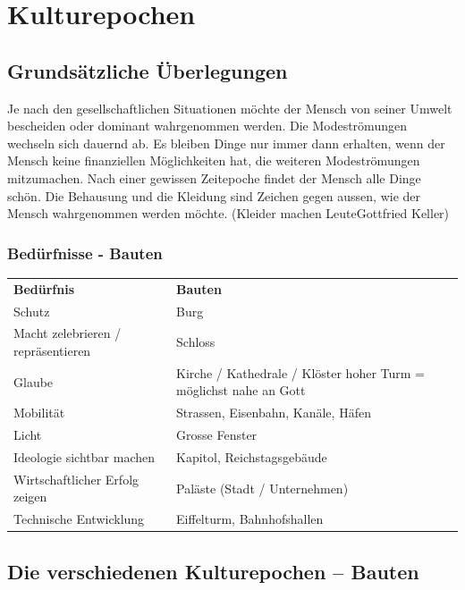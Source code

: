\documentclass[10pt, openright=true]{scrartcl}
\begin{document}
\section{Kulturepochen}
\subsection{Grundsätzliche Überlegungen}
Je nach den gesellschaftlichen Situationen möchte der Mensch von seiner Umwelt bescheiden oder dominant wahrgenommen werden. Die Modeströmungen wechseln sich dauernd ab. Es bleiben Dinge nur immer dann erhalten, wenn der Mensch keine finanziellen Möglichkeiten hat, die weiteren Modeströmungen mitzumachen. Nach einer gewissen Zeitepoche findet der Mensch alle Dinge schön. Die Behausung und die Kleidung sind Zeichen gegen aussen, wie der Mensch wahrgenommen werden möchte. (\glqq Kleider machen Leute\grqq Gottfried Keller)
\subsubsection{Bedürfnisse - Bauten}
\begin{tabularx}{1\textwidth}{L{6cm}   X}
 \textbf{Bedürfnis} & \textbf{Bauten} \\ 
Schutz & Burg \\
 Macht zelebrieren / repräsentieren & Schloss\\
Glaube & Kirche / Kathedrale / Klöster \newline hoher Turm = möglichst nahe an Gott\\
 Mobilität & Strassen, Eisenbahn, Kanäle, Häfen\\
Licht & Grosse Fenster\\
 Ideologie sichtbar machen & Kapitol, Reichstagsgebäude\\
Wirtschaftlicher Erfolg zeigen & Paläste (Stadt / Unternehmen)\\
 Technische Entwicklung & Eiffelturm, Bahnhofshallen\\
\end{tabularx}
\subsection{Die verschiedenen Kulturepochen – Bauten}
\end{document}
